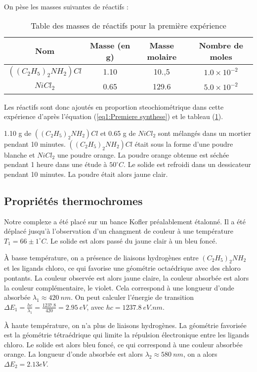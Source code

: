\documentclass[12pt]{article}
\begin{document}
On pèse les masses suivantes de réactifs :
\begin{table}[h!]
    \begin{center}
        \begin{tabular}{|c|c|c|c|}
            \hline
            Nom & Masse (en g) & Masse molaire & Nombre de moles \\
            \hline
            $((C_2H_5)_2NH_2)Cl$ & 1.10 & 10.,5 & $1.0\times 10^{-2}$ \\
            \hline
            $NiCl_2$ & 0.65 & 129.6 & $5.0 \times 10^{-2}$ \\
            \hline
        \end{tabular}
    \end{center}
    \caption{Table des masses de réactifs pour la première expérience}
    \label{tab1:masse1}
\end{table}

Les réactifs sont donc ajoutés en proportion steochiométrique dans cette expérience d'après l'équation (\ref{eq1:Premiere synthese}) et le tableau (\ref{tab1:masse1}).

1.10 g de $((C_2H_5)_2NH_2)Cl$ et 0.65 g de $NiCl_2$ sont mélangés dans un mortier pendant 10 minutes. 
$((C_2H_5)_2NH_2)Cl$ était sous la forme d'une poudre blanche et $NiCl_2$ une poudre orange.
La poudre orange obtenue est séchée pendant 1 heure dans une étude à $50^\circ C$.
Le solide est refroidi dans un dessicateur pendant 10 minutes. La poudre était alors jaune clair.

\subsection{Propriétés thermochromes}
Notre complexe a été placé sur un bance Kofler préalablement étalonné. 
Il a été déplacé jusqu'à l'observation d'un changment de couleur à une température $T_1=66\pm 1^\circ C$.
Le solide est alors passé du jaune clair à un bleu foncé.

À basse température, on a présence de liaisons hydrogènes entre $(C_2H_5)_2NH_2$ et les ligands chloro, ce qui favorise une géométrie octaédrique avec des chloro pontants.
La couleur observée est alors jaune claire, la couleur absorbée est alors la couleur complémentaire, le violet.
Cela correspond à une longueur d'onde absorbée $\lambda_1\approx 420 \ nm$. 
On peut calculer l'énergie de transition $\Delta E_1 =\frac{hc}{\lambda_1}=\frac{1237.8}{420}=2.95 \ eV$, avec $hc=1237.8 \ eV.nm$.

À haute température, on n'a plus de liaisons hydrogènes.
La géométrie favorisée est la géométrie tétraédrique qui limite la répulsion électronique entre les ligands chloro.
Le solide est alors bleu foncé, ce qui correspond à une couleur absorbée orange.
La longueur d'onde absorbée est alors $\lambda_2\approx 580 \ nm$, on a alors $\Delta E_2=2.13 eV$.
\end{document}
